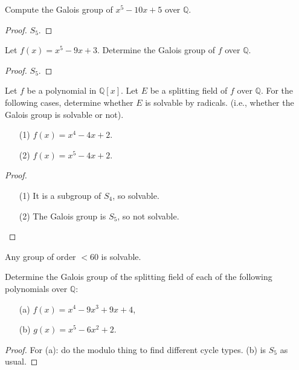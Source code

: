 
\begin{prob}[F2017-Q4]
    Compute the Galois group of \(x^{5}-10x+5\) over \(\mathbb{Q}\).
\end{prob}
\begin{proof}
    $S_5$.
\end{proof}


\begin{prob}[F2004-Q3]
    Let \(f(x) = x^5 - 9x + 3\). Determine the Galois group of \(f\) over \(\mathbb{Q}\).
\end{prob}
\begin{proof}
    $S_5$.
\end{proof}

\begin{prob}[F2006-Q2]
    Let \(f\) be a polynomial in \(\mathbb{Q}[x]\). Let \(E\) be a splitting field of \(f\) over \(\mathbb{Q}\). For the following cases, determine whether \(E\) is solvable by radicals. (i.e., whether the Galois group is solvable or not).
    \begin{itemize}
        \item[(1)] \(f(x) = x^4 - 4x + 2\).
        \item[(2)] \(f(x) = x^5 - 4x + 2\).
    \end{itemize}
\end{prob}
\begin{proof}
    \begin{enumerate}
        \item[(1)] It is a subgroup of $S_4$, so solvable.
        \item[(2)] The Galois group is $S_5$, so not solvable.  
    \end{enumerate}
\end{proof}

\begin{prop}
    Any group of order $<60$ is solvable.
\end{prop}



\begin{prob}[S2011-Q3]
    Determine the Galois group of the splitting field of each of the following polynomials over \(\mathbb{Q}\):
    \begin{itemize}
        \item[(a)] \(f(x)=x^4-9x^3+9x+4\),
        \item[(b)] \(g(x)=x^5-6x^2+2\).
    \end{itemize}
\end{prob}
\begin{proof}
    For (a): do the modulo thing to find different cycle types. (b) is $S_5$ as usual.
\end{proof}



